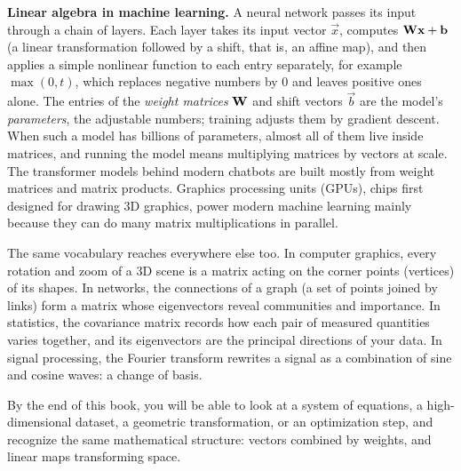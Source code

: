 \begin{applicationbox}
\textbf{Linear algebra in machine learning.} A neural network passes its input through a chain of
layers. Each layer takes its input
vector $\vec x$, computes $\mathbf{W}\mathbf{x} + \mathbf{b}$ (a linear transformation followed by a shift, that is,
an affine map), and then applies a simple nonlinear function to each entry separately, for example
$\max(0,t)$, which replaces negative numbers by $0$ and leaves positive ones alone.
The entries of the \emph{weight matrices} $\mathbf{W}$ and shift vectors $\vec b$ are the model's
\emph{parameters}, the adjustable numbers; training adjusts them by gradient descent. When such a
model has billions of parameters, almost all of
them live inside matrices, and running the model means multiplying matrices by vectors at scale. The
transformer models behind modern chatbots are built mostly from weight matrices and matrix products.
Graphics processing units (GPUs), chips first designed for drawing 3D graphics, power modern machine
learning mainly because they can do many matrix multiplications in parallel.
\end{applicationbox}

The same vocabulary reaches everywhere else too. In computer graphics, every rotation and zoom of a
3D scene is a matrix acting on the corner points (vertices) of its shapes. In networks, the
connections of a graph (a set of points joined by links) form a matrix whose
eigenvectors reveal communities and importance. In statistics, the covariance matrix records how each
pair of measured quantities varies together, and its eigenvectors are
the principal directions of your data. In signal processing, the Fourier transform rewrites a signal
as a combination of sine and cosine waves: a change of basis.

\begin{aestheticbox}
By the end of this book, you will be able to look at a system of equations, a high-dimensional
dataset, a geometric transformation, or an optimization step, and recognize the same mathematical
structure: vectors combined by weights, and linear maps transforming space.
\end{aestheticbox}

